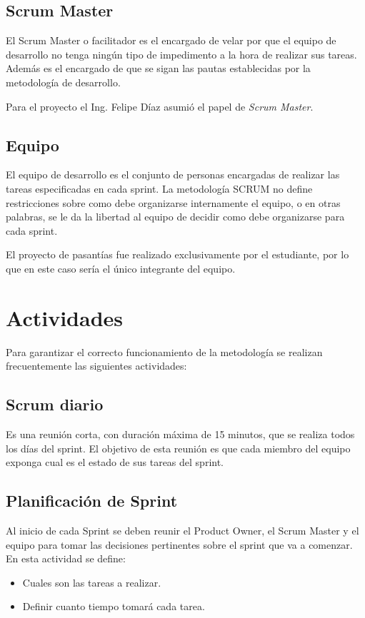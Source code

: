 \subsection{Scrum Master}
El Scrum Master o facilitador es el encargado de velar por que el equipo de
desarrollo no tenga ningún tipo de impedimento a la hora de realizar sus tareas.
Además es el encargado de que se sigan las pautas establecidas por la metodología
de desarrollo.

Para el proyecto el Ing. Felipe Díaz asumió el papel de \emph{Scrum Master}.

\subsection{Equipo}

El equipo de desarrollo es el conjunto de personas encargadas de realizar las tareas
especificadas en cada sprint. La metodología SCRUM no define restricciones sobre como
debe organizarse internamente el equipo, o en otras palabras, se le da la libertad al
equipo de decidir como debe organizarse para cada sprint.

El proyecto de pasantías fue realizado exclusivamente por el estudiante, por lo que
en este caso sería el único integrante del equipo.


\section{Actividades}

Para garantizar el correcto funcionamiento de la metodología se realizan frecuentemente
las siguientes actividades:

\subsection{Scrum diario}
Es una reunión corta, con duración máxima de 15 minutos, que se realiza todos los días
del sprint. El objetivo de esta reunión es que cada miembro del equipo exponga cual
es el estado de sus tareas del sprint.

\subsection{Planificación de Sprint}
Al inicio de cada Sprint se deben reunir el Product Owner, el Scrum Master y el equipo
para tomar las decisiones pertinentes sobre el sprint que va a comenzar. En esta actividad
se define:

\begin{itemize}
  \item Cuales son las tareas a realizar.
  \item Definir cuanto tiempo tomará cada tarea.
\end{itemize}

